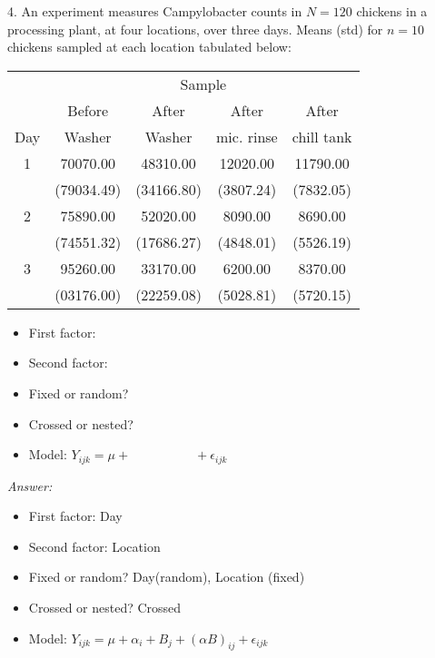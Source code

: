 4.  An experiment measures Campylobacter counts in $N=120$ chickens in a processing plant, at four locations, over three days.
Means (std) for $n=10$ chickens sampled at each location tabulated below:
\begin{table}[H]
	\renewcommand{\arraystretch}{1.5}
	\centering
	\begin{tabular}{c|cccc}
		& \multicolumn{4}{c}{Sample} \\
		& Before & After & After & After\\
		Day & Washer & Washer & mic. rinse & chill tank \\
		\hline
		1 & 70070.00 & 48310.00 & 12020.00 & 11790.00\\
		& (79034.49) & (34166.80) & (3807.24) & (7832.05)\\		
		2 & 75890.00 & 52020.00 & 8090.00 & 8690.00\\
		& (74551.32) & (17686.27) & (4848.01) & (5526.19)\\
		3 & 95260.00 & 33170.00 & 6200.00 & 8370.00\\
		& (03176.00) & (22259.08) & (5028.81) & (5720.15)\\		  
		\bottomrule
	\end{tabular}
\end{table}

\begin{itemize}
	\item First factor:  
	\item Second factor: 
	\item Fixed or random?  
	\item Crossed or nested?
	\item Model:  $Y_{ijk} = \mu  + \quad \quad \quad \quad \quad  + \epsilon_{ijk}$
\end{itemize}

{\it Answer:}\\
\begin{pf}
	\begin{itemize}
		\item First factor:  Day
		\item Second factor: Location
		\item Fixed or random?  Day(random), Location (fixed)
		\item Crossed or nested?  Crossed
		\item Model:   $Y_{ijk} = \mu + \alpha_i + B_{j} + (\alpha B)_{ij} + \epsilon_{ijk}$
	\end{itemize}
\end{pf}


